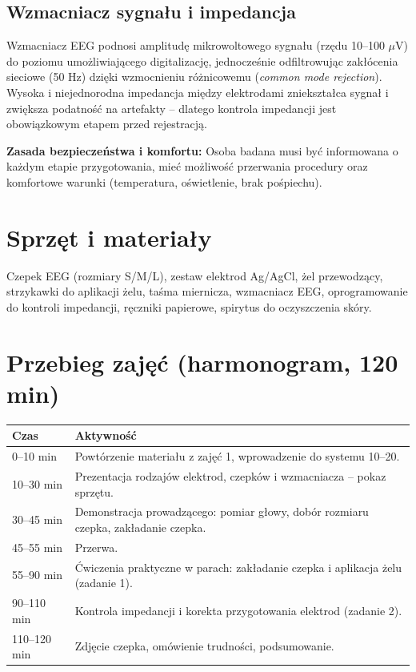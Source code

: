 \documentclass[11pt,a4paper]{article}
\newcommand{\infobox}[1]{%
  \par\noindent\colorbox{lgray}{\parbox{\dimexpr\linewidth-2\fboxsep}{\vspace{2pt}#1\vspace{2pt}}}\par\vspace{4pt}}
\begin{document}
\subsection{Wzmacniacz sygnału i impedancja}
Wzmacniacz EEG podnosi amplitudę mikrowoltowego sygnału (rzędu 10--100 $\mu$V) do poziomu umożliwiającego digitalizację, jednocześnie odfiltrowując zakłócenia sieciowe (50 Hz) dzięki wzmocnieniu różnicowemu (\emph{common mode rejection}). Wysoka i niejednorodna impedancja między elektrodami zniekształca sygnał i zwiększa podatność na artefakty -- dlatego kontrola impedancji jest obowiązkowym etapem przed rejestracją.

\infobox{\textbf{Zasada bezpieczeństwa i komfortu:} Osoba badana musi być informowana o każdym etapie przygotowania, mieć możliwość przerwania procedury oraz komfortowe warunki (temperatura, oświetlenie, brak pośpiechu).}

\section{Sprzęt i materiały}
Czepek EEG (rozmiary S/M/L), zestaw elektrod Ag/AgCl, żel przewodzący, strzykawki do aplikacji żelu, taśma miernicza, wzmacniacz EEG, oprogramowanie do kontroli impedancji, ręczniki papierowe, spirytus do oczyszczenia skóry.

\section{Przebieg zajęć (harmonogram, 120 min)}
\begin{center}
\begin{tabular}{@{}p{2.3cm}p{11.7cm}@{}}
\toprule
\textbf{Czas} & \textbf{Aktywność}\\
\midrule
0--10 min & Powtórzenie materiału z zajęć 1, wprowadzenie do systemu 10--20.\\
10--30 min & Prezentacja rodzajów elektrod, czepków i wzmacniacza -- pokaz sprzętu.\\
30--45 min & Demonstracja prowadzącego: pomiar głowy, dobór rozmiaru czepka, zakładanie czepka.\\
45--55 min & Przerwa.\\
55--90 min & Ćwiczenia praktyczne w parach: zakładanie czepka i aplikacja żelu (zadanie 1).\\
90--110 min & Kontrola impedancji i korekta przygotowania elektrod (zadanie 2).\\
110--120 min & Zdjęcie czepka, omówienie trudności, podsumowanie.\\
\bottomrule
\end{tabular}
\end{center}
\end{document}
